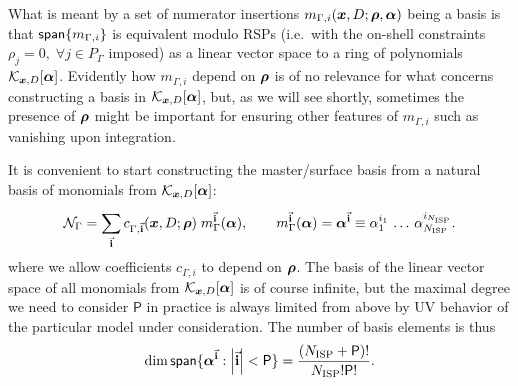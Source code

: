 What is meant by a set of numerator insertions $m_{\Gamma,i}(\vb*{x},D;\vb*{\rho},\vb*{\alpha})$ being a basis is that
$\mathsf{span}\{m_{\Gamma,i}\}$ is equivalent
modulo RSPs (i.e.\ with the on-shell constraints $\rho_j = 0,\;\forall j\in P_\Gamma$ imposed)
as a linear vector space to a ring of polynomials $\mathcal{K}_{\vb*{x},D}[\vb*{\alpha}]$.
Evidently how $m_{\Gamma,i}$ depend on $\vb*{\rho}$ is of no relevance for what concerns constructing
a basis in $\mathcal{K}_{\vb*{x},D}[\vb*{\alpha}]$, but, as we will see shortly, sometimes the presence
of $\vb*{\rho}$ might be important for ensuring other features of $m_{\Gamma,i}$ such as vanishing
upon integration.


It is convenient to start constructing the master/surface basis from a natural basis of monomials from $\mathcal{K}_{\vb*{x},D}[\vb*{\alpha}]$:
\begin{equation}
  \mathcal{N}_\Gamma = \sum_{\va{i}}^{} c_{\Gamma, \va{i}}(\vb*{x},D;\vb*{\rho}) \; m_\Gamma^{\va{i}}(\vb*{\alpha}), \qquad
  m_\Gamma^{\va{i}}(\vb*{\alpha}) = \vb*{\alpha}^{\va{i}} \equiv 
  \alpha_1^{i_1}\,\ldots{}\,\alpha_{N_\text{ISP} }^{i_{N_\text{ISP} }}.
\end{equation}
where we allow coefficients $c_{\Gamma,i}$ to depend on $\vb*{\rho}$.
The basis of the linear vector space of all monomials from $\mathcal{K}_{\vb*{x},D}[\vb*{\alpha}]$ is of course infinite,
but the maximal degree  we need to consider $\mathsf{P}$ in practice is always limited from above by UV behavior of the particular model under consideration.
The number of basis elements is thus 
\begin{equation} \label{eq:number_of_monomials}
  \dim{\mathsf{span}\{\vb*{\alpha}^{\va{i}} : \abs{\va{i}} < \mathsf{P}\}} =  \frac{(N_\text{ISP} + \mathsf{P})!}{N_\text{ISP}! \mathsf{P}!}.
\end{equation}


